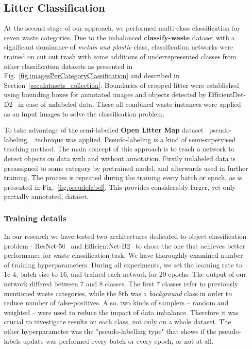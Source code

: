 \documentclass{article}
\begin{document}
\subsection{Litter Classification}
\label{sec:litter_classification}
At the second stage of our approach, we performed multi-class classification for seven waste categories. Due to the imbalanced \textbf{classify-waste} dataset with a significant dominance of \textit{metals and plastic} class, classification networks were trained on cut out trash with some additions of underrepresented classes from other classification datasets as presented in Fig.~\ref{fig.imagesPerCategoryClassification} and described in Section~\ref{sec:datasets_collection}. Boundaries of cropped litter were established using bounding boxes for annotated images and objects detected by EfficientDet-D2~\cite{efficientdet2020} in case of unlabeled data. These all combined waste instances were applied as an input images to solve the classification problem.

To take advantage of the semi-labelled \textbf{Open Litter Map} dataset~\cite{openlittermap2018} pseudo-labeling ~\cite{Lee2013PseudoLabelT} technique was applied. Pseudo-labeling is a kind of semi-supervised teaching method. The main concept of this approach is to teach a network to detect objects on data with and without annotation. Firstly unlabeled data is preassigned to some category by pretrained model, and afterwards used in further training. The process is repeated during the training every batch or epoch, as is presented in Fig.~\ref{fig.pseudolabel}. This provides considerably larger, yet only partially annotated, dataset. 

\subsubsection{Training details}

In our research we have tested two architectures dedicated to object classification problem - ResNet-50~\cite{resnet50} and EfficientNet-B2~\cite{efficientnet2019} to chose the one that achieves better performance for waste classification task. We have thoroughly examined number of training hyperparameters. During all experiments, we set the learning rate to 1e-4, batch size to 16, and trained each network for 20 epochs. The output of our network differed between 7 and 8 classes. The first 7 classes refer to previously mentioned waste categories, while the 8th was a \textit{background} class in order to reduce number of false-positives. Also, two kinds of samplers -- random and weighted -- were used to reduce the impact of data imbalance. Therefore it was crucial to investigate results on each class, not only on a whole dataset. The other hyperparameter was the "pseudo-labelling type" that shows if the pseudo-labels update was performed every batch or every epoch, or not at all. 
\end{document}
